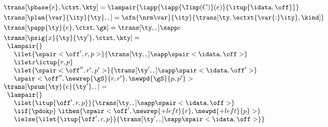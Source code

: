 \begin{figure}
\small
{} 

\[
\begin{array}{l}
\trans[\pbase{e},\ctxt,\kty] =
  \lampair{\iapp {\iapp {\Iimp(C)} (e)} {\itup {\idata,\off}}}
\\[3pt] %
\trans[\plam{\var}{\ity}{\ty},,] =
   \sfn{\nrm\var}{\ity}{\trans[\ty,\ectxt{\var{:}\ity},\kind]}
\\[3pt] %
\trans[\papp{\ty}{e},\ctxt,\gk] =
  \trans[\ty,,] \sapp e  
\\[3pt]
\trans[\psig{x}{\ty}{\ty'},\ctxt,\kty] = \\
  \begin{array}{l}  
    \lampair{} \\
    \quad  \ilet {\spair<\off',r,p>} 
    {{\trans[\ty,,]} \sapp \spair<\idata,\off>} \\
    \quad  \ilet x {\ictup{r,p}}\\
    \quad  \ilet {\spair<\off'',r',p'>} 
    {{\trans[\ty',,]} \sapp \spair<\idata,\off'>} \\
    \quad \spair<\off'',\newrep {\gS}{r,r'},\newpd {\gS}{p,p'}>
  \end{array}  
\\[3pt]
  \trans[\psum{\ty}{e}{\ty'},,] = \\
  \begin{array}{l}  
  \lampair{} \\
  \quad \ilet {\itup{\off',r,p}}{\trans[\ty,,] \sapp \spair<\idata,\off>} \\
  \quad \iif {\pdok p} \; \ithen {
    \def \r {\newrep {+left}{r}}
    \def \p {\newpd {+left}{p}}
    \spair<\off',\r,\p>} \\
  \quad \ielse {\ilet {\itup{\off',r,p}}{\trans[\ty',,] \sapp \spair<\idata,\off>}} \\
  \quad 

\end{array}
\end{array}\]
\end{figure}
